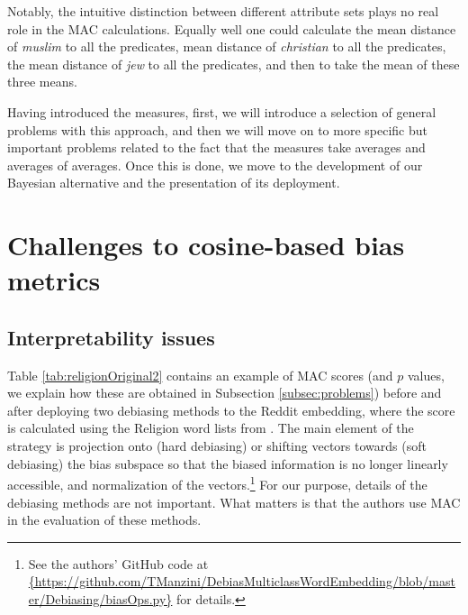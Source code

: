 \documentclass{clv3}
\begin{document}
Notably, the intuitive distinction between different attribute sets
plays no real role in the \textsf{MAC} calculations. Equally well one
could calculate the mean distance of \emph{muslim} to all the
predicates, mean distance of \emph{christian} to all the predicates,
the mean distance of \emph{jew} to all the predicates, and then to take the
mean of these three means.

Having introduced the measures, first, we will introduce a selection of
general problems with this approach, and then we will move on to more
specific but important problems related to the fact that the measures
take averages and averages of averages. Once this is done, we move to
the development of our Bayesian alternative and the presentation of its
deployment.





\hypertarget{challenges-to-cosine-based-bias-metrics}{%
\section{Challenges to cosine-based bias
metrics}\label{challenges-to-cosine-based-bias-metrics}}

\label{sec:challenges}

\hypertarget{interpretability-issues}{%
\subsection{Interpretability issues}\label{interpretability-issues}}

\label{subsec:interpretability}

Table \ref{tab:religionOriginal2} contains an example of \textsf{MAC}
scores (and \(p\) values, we explain how these are obtained in
Subsection \ref{subsec:problems}) before and after deploying two
debiasing methods to the Reddit embedding, where the score is calculated
using the Religion word lists from \citep{Manzini2019blackToCriminal}. The main element of the strategy is projection  onto (hard debiasing) or shifting vectors towards (soft debiasing) the bias subspace so that the biased information is no longer linearly accessible, and normalization of the vectors.\footnote{See the authors' GitHub code at \url{{https://github.com/TManzini/DebiasMulticlassWordEmbedding/blob/master/Debiasing/biasOps.py}}  for details.}  For our purpose, details of the debiasing methods are not important. What matters is that the authors use \textsf{MAC} in the evaluation of these methods.
\end{document}
